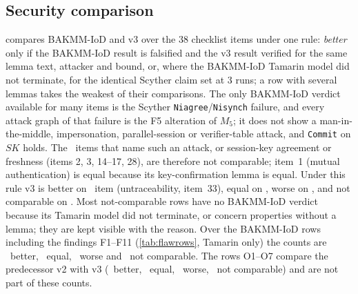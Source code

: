 \subsection{Security comparison}\label{sec:comparison}
 compares BAKMM-IoD and v3 over the 38 checklist items under one rule: \emph{better} only if the BAKMM-IoD
result is falsified and the v3 result verified for the same lemma text, attacker and bound, or, where the BAKMM-IoD Tamarin model
did not terminate, for the identical Scyther claim set at 3 runs; a row with several lemmas takes the weakest of their
comparisons. The only BAKMM-IoD verdict available for many items is the Scyther \texttt{Niagree}/\texttt{Nisynch} failure, and
every attack graph of that failure is the F5 alteration of $M_5$; it does not show a man-in-the-middle, impersonation,
parallel-session or verifier-table attack, and \texttt{Commit} on $SK$ holds. The \DomFiveOnly\ items that name such an attack,
or session-key agreement or freshness (items 2, 3, 14--17, 28), are therefore not comparable; item~1 (mutual authentication) is
equal because its key-confirmation lemma is equal. Under this rule v3 is better on \DomBetter\ item (untraceability, item~33),
equal on \DomEqual, worse on \DomWorse, and not comparable on \DomNC. Most not-comparable rows have no BAKMM-IoD verdict because
its Tamarin model did not terminate, or concern properties without a lemma; they are kept visible with the reason. Over the
BAKMM-IoD rows including the findings F1--F11 (\cref{tab:flawrows}, Tamarin only) the counts are \DomAllBetter\ better,
\DomAllEqual\ equal, \DomAllWorse\ worse and \DomAllNC\ not comparable. The rows O1--O7 compare the predecessor v2 with v3
(\DomVtwoBetter\ better, \DomVtwoEqual\ equal, \DomVtwoWorse\ worse, \DomVtwoNC\ not comparable) and are not part of these counts.


